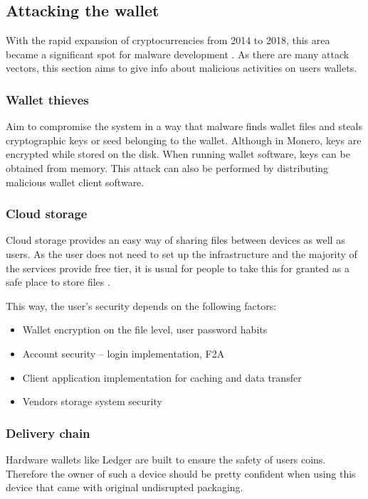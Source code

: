 \documentclass[
  printed, %
  table,   %
  lof,     %
  lot,     %
           oneside, color
]{fithesis3}
\begin{document}
\subsection{Attacking the wallet}
With the rapid expansion of cryptocurrencies from 2014 to 2018, this area became a significant spot for malware development \cite{schaupp2018cryptocurrency}. As there are many attack vectors, this section aims to give info about malicious activities on users wallets.

\subsubsection{Wallet thieves}

Aim to compromise the system in a way that malware finds wallet files and steals cryptographic keys or seed belonging to the wallet. Although in Monero, keys are encrypted while stored on the disk. When running wallet software, keys can be obtained from memory. This attack can also be performed by distributing malicious wallet client software.

\subsubsection{Cloud storage}

Cloud storage provides an easy way of sharing files between devices as well as users. As the user does not need to set up the infrastructure and the majority of the services provide free tier, it is usual for people to take this for granted as a safe place to store files \cite{caviglione2017covert}.

This way, the user's security depends on the following factors:
\begin{itemize}\itemsep0em
\item Wallet encryption on the file level, user password habits
\item Account security -- login implementation, F2A
\item Client application implementation for caching and data transfer
\item Vendors storage system security
\end{itemize} 

\subsubsection{Delivery chain}

Hardware wallets like Ledger are built to ensure the safety of users coins. Therefore the owner of such a device should be pretty confident when using this device that came with original undisrupted packaging. 
\end{document}
